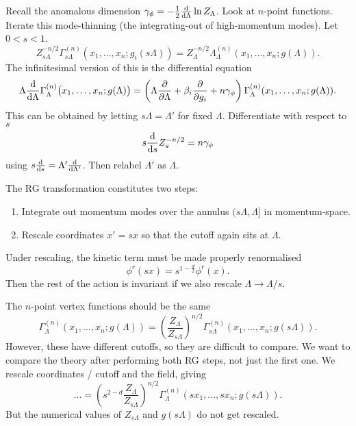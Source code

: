 Recall the anomalous dimension $\gamma_\phi = -\frac{1}{2} \dv{\Lambda} \ln Z_\Lambda$.
Look at $n$-point functions.
Iterate this mode-thinning (the integrating-out of high-momentum modes). Let $0 < s < 1$.
\begin{equation}
  Z_{s \Lambda}^{-n / 2} \Gamma^{(n)}_{s \Lambda} (x_1, \dots, x_n; g_i(s \Lambda)) = Z_\Lambda^{-n / 2} \Lambda_{\Lambda}^{(n)} (x_1, \dots, x_n; g(\Lambda)).
\end{equation}
The infinitesimal version of this is the differential equation
\begin{equation}
  \Lambda \dv{\Lambda} \Gamma^{(n)}_\Lambda \bigl(x_1, \dots, x_n; g(\Lambda) \bigr) = \left( \Lambda \frac{\partial }{\partial \Lambda} + \beta_i \frac{\partial }{\partial g_i} + n \gamma_\phi \right) \Gamma_\Lambda^{(n)} (x_1, \dots, x_n; g(\Lambda)).
\end{equation}
This can be obtained by letting $s \Lambda = \Lambda'$ for fixed $\Lambda$. Differentiate with respect to $s$
\begin{equation}
  s \dv{s} Z_s^{-n / 2} = n \gamma_\phi
\end{equation}
using $s \dv{s} = \Lambda' \dv{\Lambda'}$.  Then relabel $\Lambda'$ as $\Lambda$.

The RG transformation constitutes two steps:
\begin{enumerate}[1)]
  \item Integrate out momentum modes over the annulus $(s \Lambda, \Lambda]$ in momentum-space.
  \item Rescale coordinates $x' = s x$ so that the cutoff again sits at $\Lambda$.
\end{enumerate}

Under rescaling, the kinetic term must be made properly renormalised
\begin{equation}
  \phi^r(sx) = s^{1 - \frac{d}{2}} \phi^r(x).
\end{equation}
Then the rest of the action is invariant if we also rescale $\Lambda \to \Lambda / s$.

The $n$-point vertex functions should be the same
\begin{equation}
  \Gamma_\Lambda^{(n)} (x_1, \dots, x_n ; g(\Lambda)) = \left( \frac{Z_\Lambda}{Z_{s\Lambda}} \right)^{n / 2} \Gamma^{(n)}_{s \Lambda} (x_1, \dots, x_n ; g(s\Lambda)).
\end{equation}
However, these have different cutoffs, so they are difficult to compare.
We want to compare the theory after performing both RG steps, not just the first one.
We rescale coordinates / cutoff and the field, giving
\begin{equation}
  \dots = \left( s^{2 - d} \frac{Z_\Lambda}{Z_{s\Lambda}} \right)^{n / 2} \Gamma^{(n)}_\Lambda (s x_1, \dots, sx_n ; g(s \Lambda)).
\end{equation}
But the numerical values of $Z_{s\Lambda}$ and $g(s \Lambda)$ do not get rescaled.

